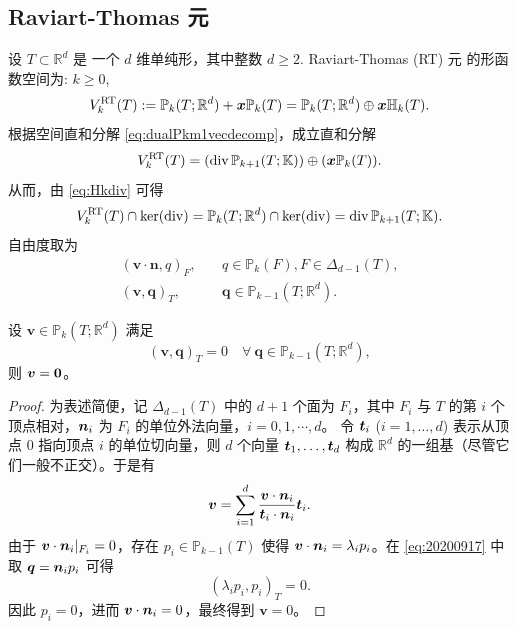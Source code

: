\subsection{Raviart-Thomas 元}

设 $T\subset \mathbb R^d$ 是 一个 $d$ 维单纯形，其中整数 $d\geq2$. Raviart-Thomas (RT) 元 \cite{RaviartThomas1977,Nedelec1980,ChenHuang2022} 的形函数空间为: $k\geq0$,
$$
V_k^{\rm RT}(T):= \mathbb P_{k}(T; \mathbb R^d) + \boldsymbol x\mathbb P_{k}(T)=\mathbb P_{k}(T; \mathbb R^d) \oplus \boldsymbol x\mathbb H_{k}(T).
$$ 
根据空间直和分解 \eqref{eq:dualPkm1vecdecomp}，成立直和分解
$$
V_k^{\rm RT}(T)= (\div\mathbb P_{k+1}(T;\mathbb K))\oplus (\boldsymbol x\mathbb P_{k}(T)).
$$ 
从而，由 \eqref{eq:Hkdiv} 可得 
$$
V_k^{\rm RT}(T)\cap\ker(\div)=\mathbb P_{k}(T; \mathbb R^d)\cap\ker(\div)=\div\mathbb P_{k+1}(T;\mathbb K).
$$
自由度取为
\begin{subequations}\label{RTfemdof}
\begin{align}
(\boldsymbol v\cdot\boldsymbol  n, q)_F, & \quad q\in\mathbb P_{k}(F),  F\in\Delta_{d-1}(T),\label{RTfemdof1}\\
(\boldsymbol v, \boldsymbol q)_T, & \quad \boldsymbol q\in\mathbb P_{k-1}(T; \mathbb R^d). \label{RTfemdof2}
\end{align}
\end{subequations}

\begin{lemma}\label{lem:20250930}
设 $\boldsymbol{v}\in \mathbb P_{k}(T; \mathbb R^d)$ 满足
\begin{equation}\label{eq:20200917}
(\boldsymbol v, \boldsymbol q)_T =0 \quad \forall~\boldsymbol q\in\mathbb P_{k-1}(T; \mathbb R^d),
\end{equation}
则 $\boldsymbol v=\bs 0$。
\end{lemma}
\begin{proof}
为表述简便，记 $\Delta_{d-1}(T)$ 中的 $d+1$ 个面为 $F_i$，其中 $F_i$ 与 $T$ 的第 $i$ 个顶点相对，$\bs n_i$ 为 $F_i$ 的单位外法向量，$i=0,1,\cdots,d$。
令 $\bs t_i$ ($i=1,\ldots,d$) 表示从顶点 $0$ 指向顶点 $i$ 的单位切向量，则 $d$ 个向量 ${\bs t_1, \ldots, \bs t_d}$ 构成 $\mathbb R^d$ 的一组基（尽管它们一般不正交）。于是有
\[
\bs v=\sum_{i=1}^d\frac{\bs v\cdot\bs n_i}{\bs t_i\cdot\bs n_i}\bs t_i.
\]
由于 $\bs v\cdot\bs n_i|_{F_i}=0$，存在 $p_i\in\mathbb P_{k-1}(T)$ 使得 $\bs v\cdot\bs n_i=\lambda_ip_i$。在 \eqref{eq:20200917} 中取 $\bs q=\bs n_ip_i$ 可得
\[
(\lambda_ip_i, p_i)_T =0.
\]
因此 $p_i=0$，进而 $\boldsymbol v\cdot\bs n_i=0$，最终得到 $\boldsymbol v= 0$。
\end{proof}


